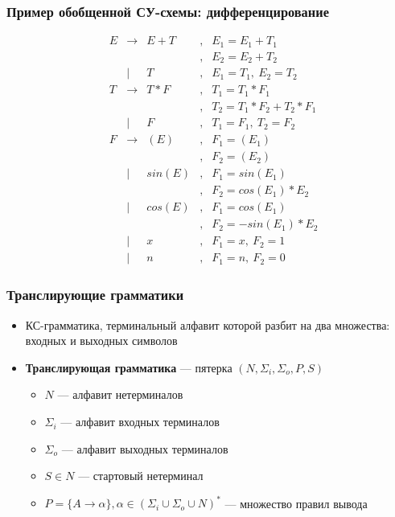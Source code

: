 \documentclass{beamer}
\begin{document}
\begin{frame}[fragile]
  \transwipe[direction=90]
  \frametitle{Пример обобщенной СУ-схемы: дифференцирование}
$$
\begin{array}{ccclcl}
&E& \rightarrow & E + T &,& E_1 = E_1 + T_1 \\
& &             &       &,& E_2 = E_2 + T_2 \\
& &      |      &     T &,& E_1 = T_1, \ E_2 = T_2  \\

&T& \rightarrow & T * F &,& T_1 = T_1 * F_1 \\
& &             &       &,& T_2 = T_1 * F_2 + T_2 * F_1\\
& &      |      &     F &,& T_1 = F_1, \ T_2 = F_2 \\

&F& \rightarrow & ( E ) &,& F_1 = (E_1) \\
& &             &       &,& F_2 = (E_2) \\
& &      |      & sin(E)&,& F_1 = sin(E_1) \\
& &             &       &,& F_2 = cos(E_1) * E_2 \\
& &      |      & cos(E)&,& F_1 = cos(E_1) \\
& &             &       &,& F_2 = -sin(E_1) * E_2 \\
& &      |      &    x  &,& F_1 = x, \ F_2 = 1 \\
& &      |      &    n  &,& F_1 = n, \ F_2 = 0  
\end{array}
$$
\end{frame}

\begin{frame}[fragile]
  \transwipe[direction=90]
  \frametitle{Транслирующие грамматики}
  \begin{itemize}
    \item КС-грамматика, терминальный алфавит которой разбит на два множества: входных и выходных символов
    \item \textbf{Транслирующая грамматика} --- пятерка $(N, \Sigma_i, \Sigma_o, P, S)$
    \begin{itemize}
      \item $N$ --- алфавит нетерминалов
      \item $\Sigma_i$ --- алфавит входных терминалов
      \item $\Sigma_o$ --- алфавит выходных терминалов
      \item $S \in N$ --- стартовый нетерминал
      \item $P = \{ A \rightarrow \alpha \}, \alpha \in (\Sigma_i \cup \Sigma_o \cup N)^*$ --- множество правил вывода
    \end{itemize}
  \end{itemize}
\end{frame}
\end{document}

